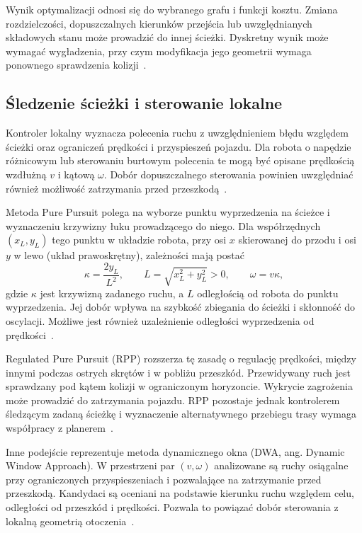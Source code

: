 \documentclass[a4paper,twoside,12pt]{book}
\begin{document}
Wynik optymalizacji odnosi się do wybranego grafu i funkcji kosztu. Zmiana rozdzielczości, dopuszczalnych kierunków przejścia lub uwzględnianych składowych stanu może prowadzić do innej ścieżki. Dyskretny wynik może wymagać wygładzenia, przy czym modyfikacja jego geometrii wymaga ponownego sprawdzenia kolizji~\cite{rb35_lavalle2006}.

\subsection{Śledzenie ścieżki i sterowanie lokalne}

Kontroler lokalny wyznacza polecenia ruchu z uwzględnieniem błędu względem ścieżki oraz ograniczeń prędkości i przyspieszeń pojazdu. Dla robota o napędzie różnicowym lub sterowaniu burtowym polecenia te mogą być opisane prędkością wzdłużną $v$ i kątową $\omega$. Dobór dopuszczalnego sterowania powinien uwzględniać również możliwość zatrzymania przed przeszkodą~\cite{rb35_fox1997dwa}.

Metoda Pure Pursuit polega na wyborze punktu wyprzedzenia na ścieżce i wyznaczeniu krzywizny łuku prowadzącego do niego. Dla współrzędnych $(x_L,y_L)$ tego punktu w układzie robota, przy osi $x$ skierowanej do przodu i osi $y$ w lewo (układ prawoskrętny), zależności mają postać
\begin{equation}
    \kappa = \frac{2y_L}{L^2},
    \qquad L = \sqrt{x_L^2+y_L^2}>0,
    \qquad \omega = v\kappa,
    \label{eq:planowanie-pure-pursuit}
\end{equation}
gdzie $\kappa$ jest krzywizną zadanego ruchu, a $L$ odległością od robota do punktu wyprzedzenia. Jej dobór wpływa na szybkość zbiegania do ścieżki i skłonność do oscylacji. Możliwe jest również uzależnienie odległości wyprzedzenia od prędkości~\cite{rb3_macenski2023rpp}.

Regulated Pure Pursuit (RPP) rozszerza tę zasadę o regulację prędkości, między innymi podczas ostrych skrętów i w pobliżu przeszkód. Przewidywany ruch jest sprawdzany pod kątem kolizji w ograniczonym horyzoncie. Wykrycie zagrożenia może prowadzić do zatrzymania pojazdu. RPP pozostaje jednak kontrolerem śledzącym zadaną ścieżkę i wyznaczenie alternatywnego przebiegu trasy wymaga współpracy z planerem~\cite{rb3_macenski2023rpp}.

Inne podejście reprezentuje metoda dynamicznego okna (DWA, ang. Dynamic Window Approach). W przestrzeni par $(v,\omega)$ analizowane są ruchy osiągalne przy ograniczonych przyspieszeniach i pozwalające na zatrzymanie przed przeszkodą. Kandydaci są oceniani na podstawie kierunku ruchu względem celu, odległości od przeszkód i prędkości. Pozwala to powiązać dobór sterowania z lokalną geometrią otoczenia~\cite{rb35_fox1997dwa}.
\end{document}
